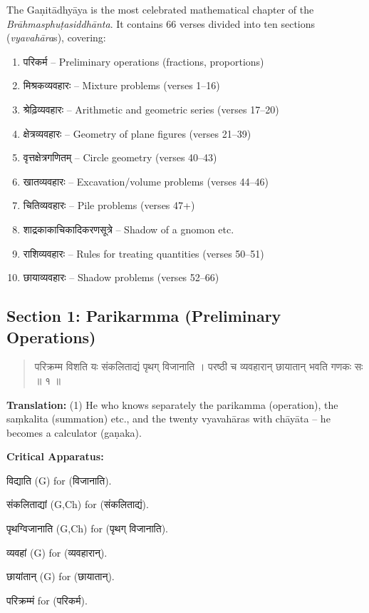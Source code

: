 \documentclass[11pt,a4paper]{article}
\newcommand{\dev}[1]{{\devanagarifont #1}}
\newenvironment{sanskritverse}{%
  \begin{quote}%
  \devanagarifont%
  \setlength{\leftmargin}{2em}%
}{\end{quote}}
\newenvironment{variants}{%
  \small%
  \color{varecolor}%
  \list{}{\leftmargin=2em\itemindent=-1em}%
}{\endlist}
\begin{document}
The Gaṇitādhyāya is the most celebrated mathematical chapter of the 
\textit{Brāhmasphuṭasiddhānta}. It contains 66 verses divided into ten sections 
(\textit{vyavahāra}s), covering:

\begin{enumerate}[label=\arabic*.]
  \item \dev{परिकर्म} -- Preliminary operations (fractions, proportions)
  \item \dev{मिश्रकव्यवहारः} -- Mixture problems (verses 1--16)
  \item \dev{श्रेढ़िव्यवहारः} -- Arithmetic and geometric series (verses 17--20)
  \item \dev{क्षेत्रव्यवहारः} -- Geometry of plane figures (verses 21--39)
  \item \dev{वृत्तक्षेत्रगणितम्} -- Circle geometry (verses 40--43)
  \item \dev{खातव्यवहारः} -- Excavation/volume problems (verses 44--46)
  \item \dev{चितिव्यवहारः} -- Pile problems (verses 47+)
  \item \dev{शाद्रकाकाचिकादिकरणसूत्रे} -- Shadow of a gnomon etc.
  \item \dev{राशिव्यवहारः} -- Rules for treating quantities (verses 50--51)
  \item \dev{छायाव्यवहारः} -- Shadow problems (verses 52--66)
\end{enumerate}

\subsection*{Section 1: Parikarmma (Preliminary Operations)}

\begin{sanskritverse}
\dev{परिक्रम्म विशति यः संकलिताद्यं पृथग् विजानाति} ।
\dev{परष्ठी च व्यवहारान् छायातान् भवति गणकः सः ॥ १ ॥}
\end{sanskritverse}

\textbf{Translation:} (1) He who knows separately the parikamma (operation), the 
saṃkalita (summation) etc., and the twenty vyavahāras with chāyāta -- he becomes 
a calculator (gaṇaka).

\textcolor{varecolor}{\textbf{Critical Apparatus:}}
\begin{variants}
\item[1.1] \dev{विद्याति} (G) \dev{for} (\dev{विजानाति}).
\item[1.2] \dev{संकलिताद्यां} (G,Ch) \dev{for} (\dev{संकलिताद्यं}).
\item[1.3] \dev{पृथग्विजानाति} (G,Ch) \dev{for} (\dev{पृथग् विजानाति}).
\item[1.4] \dev{व्यवहां} (G) \dev{for} (\dev{व्यवहारान्}).
\item[1.5] \dev{छायांतान्} (G) \dev{for} (\dev{छायातान्}).
\item[1.6] \dev{परिक्रम्मं} \dev{for} (\dev{परिकर्म}).
\end{variants}
\end{document}
